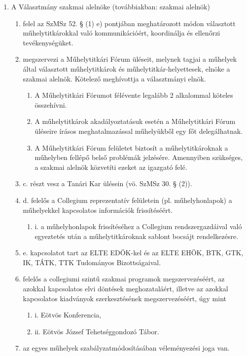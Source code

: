 \documentclass{../styles/rulebook}
\begin{document}
\begin{enumerate}
	\item A Választmány szakmai alelnöke (továbbiakban: szakmai alelnök)
	\begin{enumerate}
		\item felel az SzMSz 52. § (1) e) pontjában meghatározott módon választott műhelytitkárokkal való kommunikációért, koordinálja és ellenőrzi tevékenységüket.
		\item megszervezi a Műhelytitkári Fórum üléseit, melynek tagjai a műhelyek által választott műhelytitkárok és műhelytitkár-helyettesek, elnöke a szakmai alelnök. Kötelező meghívottja a választmányi elnök.
		\begin{enumerate}
			\item A Műhelytitkári Fórumot félévente legalább 2 alkalommal köteles összehívni.
			\item A műhelytitkárok akadályoztatásuk esetén a Műhelytitkári Fórum üléseire írásos meghatalmazással műhelyükből egy főt delegálhatnak.
			\item A Műhelytitkári Fórum felületet biztosít a műhelytitkároknak a műhelyben fellépő belső problémák jelzésére. Amennyiben szükséges, a szakmai alelnök közvetíti ezeket az igazgató felé.
		\end{enumerate}
		\item c. részt vesz a Tanári Kar ülésein (vö. SzMSz 30. § (2)).
		\item d. felelős a Collegium reprezentatív felületein (pl. műhelyhonlapok) a műhelyekkel kapcsolatos információk frissítéséért.
		\begin{enumerate}
			\item 	i. a műhelyhonlapok frissítéséhez a Collegium rendszergazdáival való egyeztetés után a műhelytitkároknak sablont bocsájt rendelkezésre.
		\end{enumerate}
		\item e. kapcsolatot tart az ELTE EDÖK-kel és az ELTE EHÖK, BTK, GTK, IK, TÁTK, TTK Tudományos Bizottságaival.
		\item felelős a collegiumi szintű szakmai programok megszervezéséért, az azokkal kapcsolatos elvi döntések meghozataláért, illetve az azokkal kapcsolatos kiadványok szerkesztésének megszervezéséért, úgy mint
		\begin{enumerate}
			\item 	i. Eötvös Konferencia,
			\item 	ii. Eötvös József Tehetséggondozó Tábor.
		\end{enumerate}
		\item az egyes műhelyek szabályzatmódosításában véleményezési joga van.

\end{enumerate}
\end{enumerate}
\end{document}
